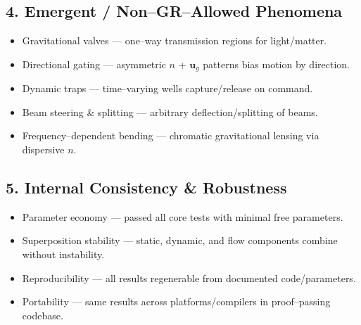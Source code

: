 \subsection*{4. Emergent / Non--GR--Allowed Phenomena}
\begin{itemize}
    \item Gravitational valves --- one--way transmission regions for light/matter.
    \item Directional gating --- asymmetric $n$ + $\mathbf{u}_g$ patterns bias motion by direction.
    \item Dynamic traps --- time--varying wells capture/release on command.
    \item Beam steering \& splitting --- arbitrary deflection/splitting of beams.
    \item Frequency--dependent bending --- chromatic gravitational lensing via dispersive $n$.
\end{itemize}

\subsection*{5. Internal Consistency \& Robustness}
\begin{itemize}
    \item Parameter economy --- passed all core tests with minimal free parameters.
    \item Superposition stability --- static, dynamic, and flow components combine without instability.
    \item Reproducibility --- all results regenerable from documented code/parameters.
    \item Portability --- same results across platforms/compilers in proof--passing codebase.
\end{itemize}
